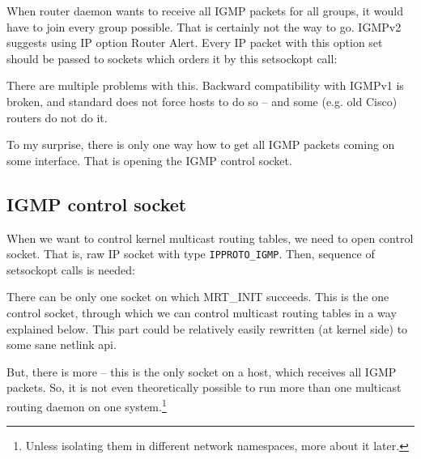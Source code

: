 When router daemon wants to receive all IGMP packets for all groups, it
would have to join every group possible. That is certainly not the way to go.
IGMPv2 suggests using IP option Router Alert. Every IP packet with this option
set should be passed to sockets which orders it by this setsockopt call:


\noindent There are multiple problems with this. Backward compatibility with
IGMPv1 is broken, and standard does not force hosts to do so -- and some (e.g.
old Cisco) routers do not do it.

To my surprise, there is only one way how to get all IGMP packets coming on
some interface. That is opening the IGMP control socket.

\subsection{IGMP control socket}

When we want to control kernel multicast routing tables, we need to open
control socket. That is, raw IP socket with type \texttt{IPPROTO\_IGMP}. Then,
sequence of setsockopt calls is needed:


There can be only one socket on which MRT\_INIT succeeds. This is the one
control socket, through which we can control multicast routing tables in a way
explained below. This part could be relatively easily rewritten (at kernel
side) to some sane netlink api.

But, there is more -- this is the only socket on a host, which receives all
IGMP packets. So, it is not even theoretically possible to run more than one
multicast routing daemon on one system.\footnote{Unless isolating them in
different network namespaces, more about it later.}
